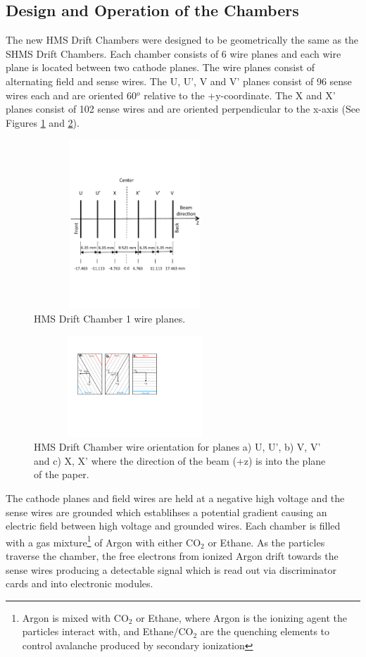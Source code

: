 \documentclass[letterpaper, 10 pt, conference]{ieeeconf}  %
\begin{document}
\subsection{Design and Operation of the Chambers}
The new HMS Drift Chambers were designed to be geometrically the same as the SHMS Drift Chambers. Each chamber consists of 6 wire planes and each wire
plane is located between two cathode planes. The wire planes consist of alternating field and sense wires. The U, U', V and V' planes consist of
96 sense wires each and are oriented 60$^{o}$ relative to the +y-coordinate. The X and X' planes consist of 102 sense wires and are oriented perpendicular to the x-axis (See
Figures \ref{fig:dc1_planes} and \ref{fig:dc_wires}).
\begin{figure}[h!]
  \centering
  \includegraphics[width=3.0in, height=2.5in]{dc2_tests/HMS_DC1_Planes.pdf}
  \caption{HMS Drift Chamber 1 wire planes.}
  \label{fig:dc1_planes}
\end{figure}
\begin{figure}[h!]
  \centering
  \includegraphics[width=3.0in, height=1.5in]{dc2_tests/HMS_DC_Wires.pdf}
  \caption{HMS Drift Chamber wire orientation for planes a) U, U', b) V, V' and c) X, X' where
  the direction of the beam (+z) is into the plane of the paper.}
  \label{fig:dc_wires}
\end{figure}
The cathode planes and field wires are held at a negative high voltage and the sense wires are grounded which establihses a potential gradient causing an electric field
between high voltage and grounded wires. Each chamber is filled with a gas mixture\footnote{Argon is mixed with CO$_{2}$ or Ethane, where Argon is the ionizing agent the
particles interact with, and Ethane/CO$_{2}$ are the quenching elements to control avalanche produced by secondary ionization} of Argon with either CO$_{2}$ or Ethane.
As the particles traverse the chamber, the free electrons from ionized Argon drift towards the sense wires producing a detectable signal which is read out via discriminator
cards and into electronic modules.
\end{document}
